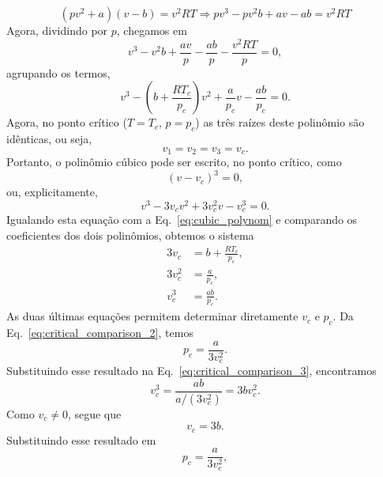 \documentclass[11pt,a4paper]{article}
\begin{document}
%
\begin{equation*}
    (pv^2 + a) (v-b) = v^2 RT \Rightarrow pv^3 - pv^2b + av - ab = v^2RT
\end{equation*} 
%
Agora, dividindo por $p$, chegamos em
%
\begin{equation*}
    v^3 - v^2b + \frac{av}{p} - \frac{ab}{p} - \frac{v^2 RT}{p} = 0,
\end{equation*}
%
agrupando os termos,
%
\begin{equation}
    v^3-\left(b+\frac{RT_c}{p_c}\right)v^2
    +\frac{a}{p_c}v
    -\frac{ab}{p_c}=0.
\label{eq:cubic_polynom}
\end{equation}
%
Agora, no ponto crítico ($T = T_c$, $p = p_c$) as três raízes deste polinômio são idênticas, ou seja,
%
\begin{equation*}
    v_1=v_2=v_3=v_c.
\end{equation*}
%
Portanto, o polinômio cúbico pode ser escrito, no ponto crítico, como
%
\begin{equation}
    (v-v_c)^3=0,
\end{equation}
%
ou, explicitamente,
%
\begin{equation}
    v^3-3v_c v^2+3v_c^2v-v_c^3=0.
\end{equation}
%
Igualando esta equação com a Eq.~\ref{eq:cubic_polynom} e comparando os coeficientes dos dois polinômios, obtemos o sistema
%
\begin{align}
    3v_c &= b+\frac{RT_c}{p_c},
    \label{eq:critical_comparison_1}\\
    3v_c^2 &= \frac{a}{p_c},
    \label{eq:critical_comparison_2}\\
    v_c^3 &= \frac{ab}{p_c}.
    \label{eq:critical_comparison_3}
\end{align}
%
As duas últimas equações permitem determinar diretamente $v_c$ e $p_c$. 
Da Eq.~\ref{eq:critical_comparison_2}, temos
%
\begin{equation}
    p_c=\frac{a}{3v_c^2}.
\end{equation}
%
Substituindo esse resultado na Eq.~\ref{eq:critical_comparison_3}, encontramos
%
\begin{equation}
    v_c^3
    =
    \frac{ab}{a/(3v_c^2)}
    =
    3bv_c^2.
\end{equation}
%
Como $v_c\neq 0$, segue que
%
\begin{equation}
    \boxed{v_c=3b}.
\label{eq:vc}
\end{equation}
%
Substituindo esse resultado em
%
\begin{equation}
    p_c=\frac{a}{3v_c^2},
\end{equation}
\end{document}

